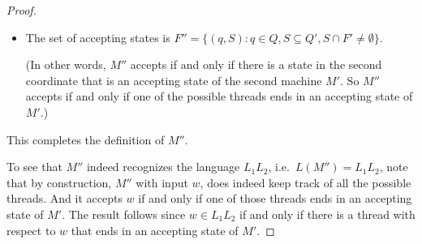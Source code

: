 \begin{flex}
\begin{proof}
\begin{itemize}
    \item The set of accepting states is $F'' = \{(q, S) : q \in Q, S \subseteq Q', S \cap F' \neq \emptyset \}$.

    (In other words, $M''$ accepts if and only if there is a state in the second coordinate that is an accepting state of the second machine $M'$. So $M''$ accepts if and only if one of the possible threads ends in an accepting state of $M'$.)

\end{itemize}

This completes the definition of $M''$. 

To see that $M''$ indeed recognizes the language $L_1 L_2$, i.e.~$L(M'') = L_1 L_2$, note that by construction, $M''$ with input $w$, does indeed keep track of all the possible threads. 
And it accepts $w$ if and only if one of those threads ends in an accepting state of $M'$. 
The result follows since $w \in L_1 L_2$ if and only if there is a thread with respect to $w$ that ends in an accepting state of $M'$.
\end{proof}
\end{flex}

